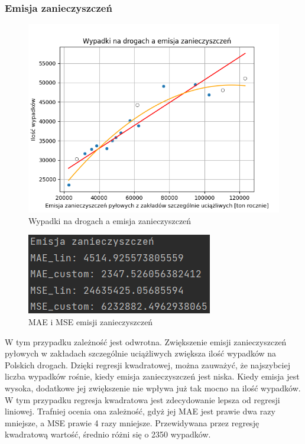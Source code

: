 \documentclass[10pt]{article}
\begin{document}
\subsubsection{Emisja zanieczyszczeń}
\begin{figure}[h]
\begin{center}
\includegraphics[width=0.5\linewidth]{images/plots/emisja.png}
\caption{Wypadki na drogach a emisja zanieczyszczeń}
\end{center}
\end{figure}
\begin{figure}[h]
\begin{center}
\includegraphics[width=0.5\linewidth]{images/errors/emisja_errors.png}
\caption{MAE i MSE emisji zanieczyszczeń}
\end{center}
\end{figure}
W tym przypadku zależność jest odwrotna. Zwiększenie emisji zanieczyszczeń pyłowych w zakładach szczególnie uciążliwych zwiększa ilość wypadków na Polskich drogach. Dzięki regresji kwadratowej, można zauważyć, że najszybciej liczba wypadków rośnie, kiedy emisja zanieczyszczeń jest niska. Kiedy emisja jest wysoka, dodatkowe jej zwiększenie nie wpływa już tak mocno na ilość wypadków. W tym przypadku regresja kwadratowa jest zdecydowanie lepsza od regresji liniowej. Trafniej ocenia ona zależność, gdyż jej MAE jest prawie dwa razy mniejsze, a MSE prawie 4 razy mniejsze. Przewidywana przez regresję kwadratową wartość, średnio różni się o 2350 wypadków.
\pagebreak
\end{document}
